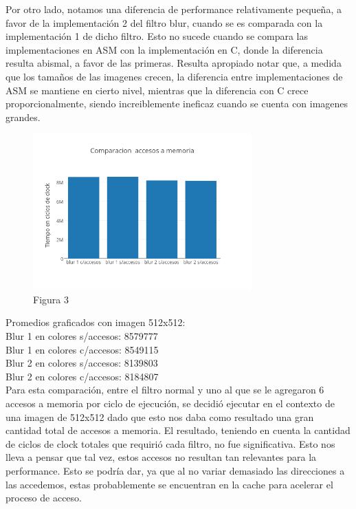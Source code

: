 \documentclass[a4paper]{article}
\begin{document}
Por otro lado, notamos una diferencia de performance relativamente pequeña, a favor de la implementación 2 del filtro blur, cuando se es comparada con la implementación 1 de dicho filtro. Esto no sucede cuando se compara las implementaciones en ASM con la implementación en C, donde la diferencia resulta abismal, a favor de las primeras. Resulta apropiado notar que, a medida que los tamaños de las imagenes crecen, la diferencia entre implementaciones de ASM se mantiene en cierto nivel, mientras que la diferencia con C crece proporcionalmente, siendo increiblemente ineficaz cuando se cuenta con imagenes grandes.

\begin{figure}[h]
  \centering
    \includegraphics[width=0.75\textwidth]{imagenes/ComparacionAccesosAMemoriaBlurColores.png}
  \caption{Figura 3}
  \label{fig:graficoblur3}
\end{figure}
 \FloatBarrier

Promedios graficados con imagen 512x512:
\\

Blur 1 en colores s/accesos: 8579777
\\

Blur 1 en colores c/accesos: 8549115
\\

Blur 2 en colores s/accesos: 8139803
\\

Blur 2 en colores c/accesos: 8184807
\\

Para esta comparación, entre el filtro normal y uno al que se le agregaron 6 accesos a memoria por ciclo de ejecución, se decidió ejecutar en el contexto de una imagen de 512x512 dado que esto nos daba como resultado una gran cantidad total de accesos a memoria. El resultado, teniendo en cuenta la cantidad de ciclos de clock totales que requirió cada filtro, no fue significativa. Esto nos lleva a pensar que tal vez, estos accesos no resultan tan relevantes para la performance. Esto se podría dar, ya que al no variar demasiado las direcciones a las accedemos, estas probablemente se encuentran en la cache para acelerar el proceso de acceso. 
\end{document}
